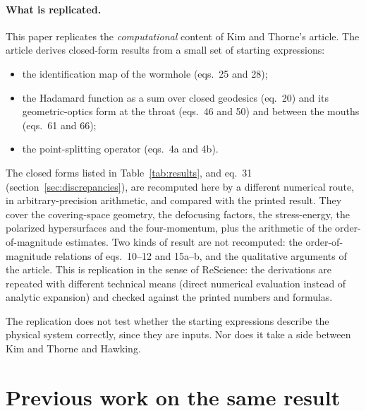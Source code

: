 \paragraph{What is replicated.} This paper replicates the \emph{computational} content of Kim and Thorne's article. The article derives closed-form results from a small set of starting expressions:
\begin{itemize}
\item the identification map of the wormhole (eqs.~25 and 28);
\item the Hadamard function as a sum over closed geodesics (eq.~20) and its geometric-optics form at the throat (eqs.~46 and 50) and between the mouths (eqs.~61 and 66);
\item the point-splitting operator (eqs.~4a and 4b).
\end{itemize}
The closed forms listed in Table~\ref{tab:results}, and eq.~31 (section~\ref{sec:discrepancies}), are recomputed here by a different numerical route, in arbitrary-precision arithmetic, and compared with the printed result. They cover the covering-space geometry, the defocusing factors, the stress-energy, the polarized hypersurfaces and the four-momentum, plus the arithmetic of the order-of-magnitude estimates. Two kinds of result are not recomputed: the order-of-magnitude relations of eqs.~10--12 and 15a--b, and the qualitative arguments of the article. This is replication in the sense of ReScience: the derivations are repeated with different technical means (direct numerical evaluation instead of analytic expansion) and checked against the printed numbers and formulas.

The replication does not test whether the starting expressions describe the physical system correctly, since they are inputs. Nor does it take a side between Kim and Thorne and Hawking.

\section{Previous work on the same result}
\label{sec:previous}

